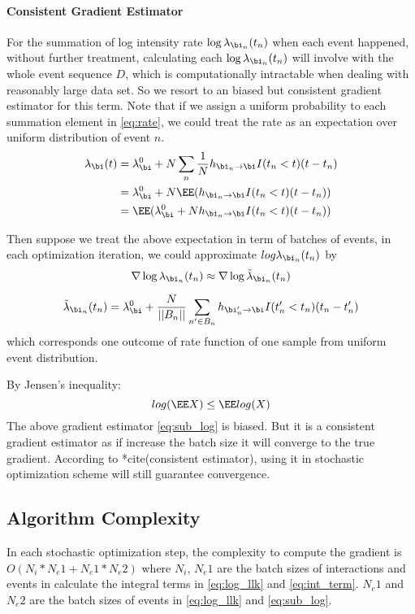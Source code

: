 {\paragraph{Consistent Gradient Estimator}For the summation of log intensity rate $\log \lambda_{\bi_n}(t_n)$ when each event happened, without further treatment, calculating each $\log \lambda_{\bi_n}(t_n)$ will involve with the whole event sequence $D$, which is computationally intractable when dealing with reasonably large data set. So we resort to an biased but consistent gradient estimator for this term.
Note that if we assign a uniform probability to each summation element in \eqref{eq:rate}, we could treat the rate as an expectation over uniform distribution of event $n$.
\begin{align}
\lambda_\bi(t) &= \lambda_\bi^0 + N \sum_{n} \frac{1}{N} h_{\bi_n \rightarrow \bi}I(t_n < t)(t-t_n) \notag \\
			   &= \lambda_\bi^0 + N \EE( h_{\bi_n \rightarrow \bi}I(t_n < t)(t-t_n)) \notag\\
			   &= \EE(  \lambda_\bi^0 + N h_{\bi_n \rightarrow \bi}I(t_n < t)(t-t_n))
\end{align}

Then suppose we treat the above expectation in term of batches of events, in each optimization iteration, we could approximate $log \lambda_{\bi_n}(t_n)$ by
\begin{equation}
\nabla \log \lambda_{\bi_n}(t_n) \approx \nabla \log \tilde{\lambda}_{\bi_n}(t_n) \label{eq:sub_log}
\end{equation}

$$ \tilde{\lambda}_{\bi_n}(t_n)= \lambda_\bi^0 + \frac{N}{\vert |B_n|\vert} \sum_{n' \in B_n} h_{\bi_n' \rightarrow \bi}I(t_n' < t_n)(t_n-t_n')$$
which corresponds one outcome of rate function of one sample from uniform event distribution.

By Jensen's inequality:
$$ log( \EE X) \le \EE log(X)$$
The above gradient estimator \eqref{eq:sub_log} is biased. But it is a consistent gradient estimator as if increase the batch size it will converge to the true gradient. According to *cite(consistent estimator), using it in stochastic optimization scheme will still guarantee convergence.  

\subsection{Algorithm Complexity}
In each stochastic optimization step, the complexity to compute the gradient is $O( N_i * N_e1 + N_e1 * N_e2 )$
where $N_i$, $N_e1$ are the batch sizes of interactions and events in calculate the integral terms in \eqref{eq:log_llk} and \eqref{eq:int_term}. $N_e1$ and $N_e2$ are the batch sizes of events in \eqref{eq:log_llk} and \eqref{eq:sub_log}.
}
